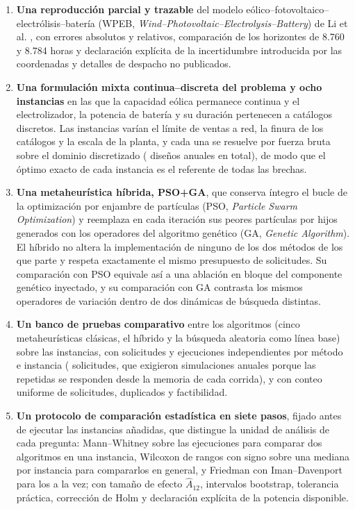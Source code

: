 \begin{enumerate}
    \item \textbf{Una reproducción parcial y trazable} del modelo eólico--fotovoltaico--electrólisis--batería (WPEB, \emph{Wind--Photovoltaic--Electrolysis--Battery}) de Li et al. \cite{Li2024WPEB}, con errores absolutos y relativos, comparación de los horizontes de 8.760 y 8.784 horas y declaración explícita de la incertidumbre introducida por las coordenadas y detalles de despacho no publicados.

    \item \textbf{Una formulación mixta continua--discreta del problema y ocho instancias} en las que la capacidad eólica permanece continua y el electrolizador, la potencia de batería y su duración pertenecen a catálogos discretos. Las instancias varían el límite de ventas a red, la finura de los catálogos y la escala de la planta, y cada una se resuelve por fuerza bruta sobre el dominio discretizado (\BruteForceDesignsTotal{} diseños anuales en total), de modo que el óptimo exacto de cada instancia es el referente de todas las brechas.

    \item \textbf{Una metaheurística híbrida, PSO+GA}, que conserva íntegro el bucle de la optimización por enjambre de partículas (PSO, \emph{Particle Swarm Optimization}) y reemplaza en cada iteración sus peores partículas por hijos generados con los operadores del algoritmo genético (GA, \emph{Genetic Algorithm}). El híbrido no altera la implementación de ninguno de los dos métodos de los que parte y respeta exactamente el mismo presupuesto de solicitudes. Su comparación con PSO equivale así a una ablación en bloque del componente genético inyectado, y su comparación con GA contrasta los mismos operadores de variación dentro de dos dinámicas de búsqueda distintas.

    \item \textbf{Un banco de pruebas comparativo} entre los \NAlgorithms{} algoritmos (cinco metaheurísticas clásicas, el híbrido y la búsqueda aleatoria como línea base) sobre las \NInstances{} instancias, con \RequestsPerRun{} solicitudes y \Replicates{} ejecuciones independientes por método e instancia (\TotalDesignRequests{} solicitudes, que exigieron \SimulationsTotal{} simulaciones anuales porque las repetidas se responden desde la memoria de cada corrida), y con conteo uniforme de solicitudes, duplicados y factibilidad.

    \item \textbf{Un protocolo de comparación estadística en siete pasos}, fijado antes de ejecutar las instancias añadidas, que distingue la unidad de análisis de cada pregunta: Mann--Whitney sobre las ejecuciones para comparar dos algoritmos en una instancia, Wilcoxon de rangos con signo sobre una mediana por instancia para compararlos en general, y Friedman con Iman--Davenport para los \NAlgorithms{} a la vez; con tamaño de efecto $\hat{A}_{12}$, intervalos bootstrap, tolerancia práctica, corrección de Holm y declaración explícita de la potencia disponible.


\end{enumerate}
